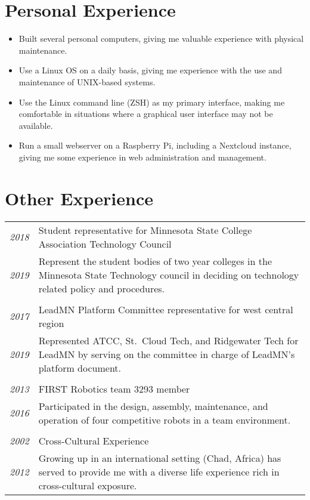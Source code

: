 \documentclass[letterpaper,10pt]{article}
\begin{document}
\section*{Personal Experience}
	\begin{itemize}
	\item Built several personal computers, giving me valuable experience with physical maintenance.
	\item Use a Linux OS on a daily basis, giving me experience with the use and maintenance of UNIX-based systems.
	\item Use the Linux command line (ZSH) as my primary interface, making me comfortable in situations where a graphical user interface may not be available.
	\item Run a small webserver on a Raspberry Pi, including a Nextcloud instance, giving me some experience in web administration and management.
	\end{itemize}
\section*{Other Experience}
	\begin{tabular}{R{2cm}|p{14cm}}
	\textsl{2018} & Student representative for Minnesota State College Association Technology Council\\
	\textsl{2019} & Represent the student bodies of two year colleges in the Minnesota State Technology council in deciding on technology related policy and procedures.\\
	\\
	\textsl{2017} & LeadMN Platform Committee representative for west central region\\
	\textsl{2019} & Represented ATCC, St.\ Cloud Tech, and Ridgewater Tech for LeadMN by serving on the committee in charge of LeadMN's platform document.\\
	\\
	\textsl{2013} & FIRST Robotics team 3293 member\\
	\textsl{2016} & Participated in the design, assembly, maintenance, and operation of four competitive robots in a team environment.\\
	\\
	\textsl{2002} & Cross-Cultural Experience\\
	\textsl{2012} &Growing up in an international setting (Chad, Africa) has served to provide me with a diverse life experience rich in cross-cultural exposure.\\
	\end{tabular}
\end{document}
